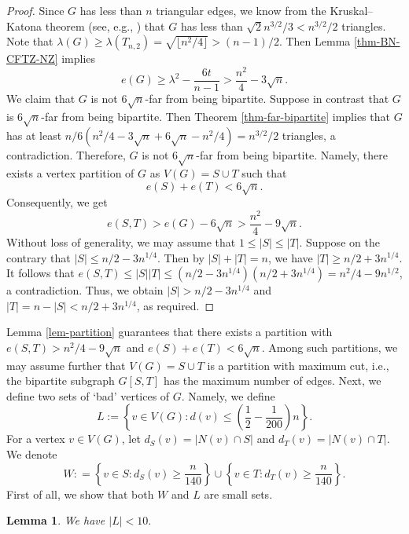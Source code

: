 \documentclass[11pt]{article}
\newtheorem{lemma}[theorem]{Lemma}
\begin{document}
\begin{proof}
Since $G$ has less than 
$n$ triangular edges, 
we know from the Kruskal--Katona theorem (see, e.g., \cite[page 305]{Bollobas78}) 
that $G$ has less than $\sqrt{2}n^{3/2}/3 < n^{3/2}/2$ triangles. 
Note that $\lambda (G)\ge \lambda (T_{n,2})= \sqrt{\lfloor n^2/4\rfloor} > {(n-1)}/{2}$.  Then Lemma \ref{thm-BN-CFTZ-NZ} implies 
\[  e(G) \ge \lambda^2 - \frac{6t}{n-1}> \frac{n^2}{4} - 3\sqrt{n}.  \]
We claim that $G$ is not $6\sqrt{n}$-far from being bipartite. 
Suppose in contrast that $G$ is $6\sqrt{n}$-far from being bipartite. Then Theorem \ref{thm-far-bipartite} 
implies that $G$ has at least ${n}/{6} 
({n^2}/{4} - 3\sqrt{n} + 6\sqrt{n} - {n^2}/{4}) 
= n^{3/2}/2$ triangles, a contradiction. Therefore, $G$ is not $6\sqrt{n}$-far from 
being bipartite. Namely, there exists a vertex partition of 
$G$ as $V(G)=S\cup T$ such that 
\begin{equation*}  
e(S) + e(T) < 6\sqrt{n}. 
\end{equation*}
 Consequently, we get 
\[ e(S,T)> e(G) - 6\sqrt{n} > \frac{n^2}{4} - 9\sqrt{n}. \] 
Without loss of generality, we may assume that 
$1\le |S| \le |T|$. Suppose on the contrary that 
 $|S| \le {n}/{2} - 3n^{1/4}$. Then by $|S| + |T|=n$, we have 
$|T| \ge {n}/{2}  + 3n^{1/4}$. It follows that 
$e(S,T)\le |S| |T| \le ({n}/{2} - 3n^{1/4})({n}/{2} + 3n^{1/4})= {n^2}/{4} - 9 n^{1/2}$, a contradiction. 
Thus, we obtain $|S| > {n}/{2} - 3n^{1/4}$ and 
 $|T| = n-|S| < {n}/{2} + 3n^{1/4}$, as required. 
        \end{proof}
        
        
     
Lemma \ref{lem-partition} guarantees that there exists a partition with  
        $e(S,T) > n^2/4 - 9\sqrt{n}$ 
        and $e(S) + e(T) < 6\sqrt{n}$. 
          Among such partitions, we may assume further that 
        $V(G)=S\cup T$ is a partition with  maximum cut, i.e., 
        the bipartite subgraph $G[S,T]$ has the maximum number of edges. 
        Next, we define two sets of ‘bad’ vertices of $G$. Namely, we define  
\[ L:= \left\{v\in V(G): d(v) \leq 
\left(\frac{1}{2}-\frac{1}{200} \right) n\right\} .\]  
        For a vertex $v\in V(G)$, let $d_S(v) = |N(v) \cap S|$ and $d_T(v) = |N(v) \cap T|$. We denote 
\[ W: = \left\{ v\in S: d_S(v) \geq  \frac{n}{140} \right\} \cup 
\left\{v \in T: d_T(v) \geq  \frac{n}{140} \right\}. \]
First of all,  we show that both $W$ and $L$ are small sets.

\begin{lemma}\label{Lupper}  
We have 
$|L| < 10.$ 
\end{lemma}
\end{document}
